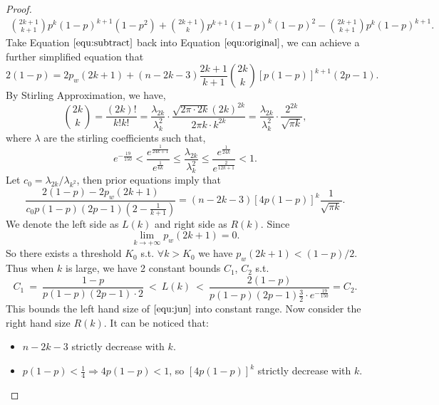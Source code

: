 \documentclass[a4paper,UKenglish]{lipics}
\theoremstyle{definition}
\begin{document}
\begin{proof}
\begin{equation}
\begin{aligned}
	\binom{2k+1}{k+1}p^k(1-p)^{k+1}(1-p^2) 
	+\binom{2k+1}{k} p^{k+1}(1-p)^k(1-p)^2 
	-\binom{2k+1}{k+1} p^k(1-p)^{k+1}.
\end{aligned}
\end{equation}
Take Equation $\ref{equ:subtract}$ back into Equation $\ref{equ:original}$, we can achieve a further simplified equation that
\begin{equation*}
	2(1 - p)
 =
	2 p_w(2k+1) +
	(n-2k-3)\frac{2k+1}{k+1}\binom{2k}{k}\left[p(1-p)\right]^{k+1}(2p-1).
\end{equation*}
By Stirling Approximation, we have,
\begin{equation*}
	\binom{2k}{k} 
= 
	\frac{(2k)!}{k!k!} 
= 
	\frac{\lambda_{2k}}{\lambda_k^2}\cdot \frac{\sqrt{2\pi \cdot 2k}(2k)^{2k}}{2\pi k \cdot k^{2k}} 
= 
	\frac{\lambda_{2k}}{\lambda_k^2}\cdot \frac{2^{2k}}{\sqrt{\pi k}},
\end{equation*}
where $\lambda$ are the stirling coefficients such that,
\begin{equation*}
	e^{-\frac{19}{150}} 
< 
	\frac{e^\frac{1}{24k+1}}{e^\frac{1}{6k}} 
\leq  
	\frac{\lambda_{2k}}{\lambda_k^2} 
\leq 
	\frac{e^\frac{1}{24k}}{e^\frac{2}{12k+1}} 
< 
	1.
\end{equation*}
Let $c_0 = \lambda_{2k} / \lambda_{k^2}$, then prior equations imply that
\begin{equation}
\label{equ:jun}
	\frac{2(1-p)-2p_w(2k+1)}{c_0p(1-p)(2p-1)(2-\frac{1}{k+1})} 
= 
	(n-2k-3)[4p(1-p)]^k \frac{1}{\sqrt{\pi k}}.
\end{equation}
We denote the left side as $L(k)$ and right side as $R(k)$. Since 
\begin{equation*}
	\lim_{k\to +\infty} p_w(2k+1) 
=
	0.
\end{equation*}
So there exists a threshold $K_0$ s.t. $ \forall k > K_0 $ we have $p_w(2k+1) < (1-p)/2$. 
Thus when $k$ is large, we have 2 constant bounds $ C_1 $, $ C_2 $ s.t.
\begin{equation}
\label{equ:bound of equation}
	C_1 
~=~
	\frac{1-p}{p(1-p)(2p-1)\cdot 2} 
~<~ 
	L(k)
~<~ 
	\frac{2(1-p)}{p(1-p)(2p-1)\frac{3}{2}\cdot e^{-\frac{19}{150}}} 
= 
	C_2.
\end{equation}
This bounds the left hand size of $\ref{equ:jun}$ into constant range.
Now consider the right hand size $R(k)$.
It can be noticed that:
\begin{itemize}
\item $ n-2k-3 $ strictly decrease with $ k $.
\item $ p(1-p) < \frac{1}{4} \Rightarrow 4p(1-p)<1 $, so $ \left[4p(1-p)\right]^k $ strictly decrease with $ k $.

\end{itemize}
\end{proof}
\end{document}
